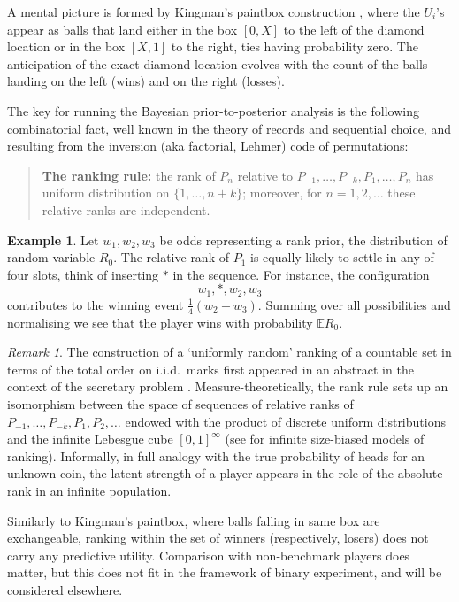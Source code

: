 \documentclass[11pt,reqno]{amsart}
\theoremstyle{definition}
\newtheorem{example}[theorem]{Example}
\theoremstyle{remark}
\newtheorem{remark}[theorem]{Remark}
\numberwithin{equation}{section}
\begin{document}
A mental picture is formed by Kingman's paintbox construction \cite{Pitman2006}, where the \(U_i\)'s appear as balls that land either in the box \([0,X]\) to the left of the diamond location or in the box \([X,1]\) to the right, ties having probability zero. The anticipation of the exact diamond location evolves with the count of the balls landing on the left (wins) and on the right (losses).

The key for running the Bayesian prior-to-posterior analysis is the following combinatorial fact, well known in the theory of records and sequential choice, and resulting from the inversion (aka factorial, Lehmer) code of permutations:

\begin{quote}
\textbf{The ranking rule:} the rank of \(P_n\) relative to \(P_{-1},\dots,P_{-k},P_1,\dots,P_n\) has uniform distribution on \(\{1,\dots,n+k\}\); moreover, for \(n=1,2,\dots\) these relative ranks are independent.
\end{quote}

\begin{example}
Let \(w_1,w_2,w_3\) be odds representing a rank prior, the distribution of random variable \(R_0\). The relative rank of \(P_1\) is equally likely to settle in any of four slots, think of inserting \(*\) in the sequence. For instance, the configuration
\[
w_1,*,w_2,w_3
\]
contributes to the winning event \(\tfrac14(w_2+w_3)\). Summing over all possibilities and normalising we see that the player wins with probability \(\mathbb{E}R_0\).
\end{example}

\begin{remark}
The construction of a `uniformly random' ranking of a countable set in terms of the total order on i.i.d.\ marks first appeared in an abstract in the context of the secretary problem \cite{Rubin1966}. Measure-theoretically, the rank rule sets up an isomorphism between the space of sequences of relative ranks of \(P_{-1},\dots,P_{-k},P_1,P_2,\dots\) endowed with the product of discrete uniform distributions and the infinite Lebesgue cube \([0,1]^\infty\) (see \cite{Gnedin2026size} for infinite size-biased models of ranking). Informally, in full analogy with the true probability of heads for an unknown coin, the latent strength of a player appears in the role of the absolute rank in an infinite population.

Similarly to Kingman's paintbox, where balls falling in same box are exchangeable, ranking within the set of winners (respectively, losers) does not carry any predictive utility. Comparison with non-benchmark players does matter, but this does not fit in the framework of binary experiment, and will be considered elsewhere.
\end{remark}
\end{document}
